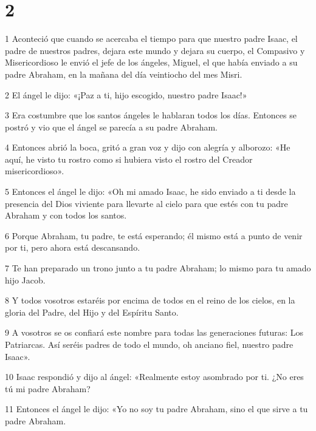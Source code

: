 \chapter{2}

\par 1 Aconteció que cuando se acercaba el tiempo para que nuestro padre Isaac, el padre de nuestros padres, dejara este mundo y dejara su cuerpo, el Compasivo y Misericordioso le envió el jefe de los ángeles, Miguel, el que había enviado a su padre Abraham, en la mañana del día veintiocho del mes Misri.

\par 2 El ángel le dijo: «¡Paz a ti, hijo escogido, nuestro padre Isaac!»

\par 3 Era costumbre que los santos ángeles le hablaran todos los días. Entonces se postró y vio que el ángel se parecía a su padre Abraham.

\par 4 Entonces abrió la boca, gritó a gran voz y dijo con alegría y alborozo: «He aquí, he visto tu rostro como si hubiera visto el rostro del Creador misericordioso».

\par 5 Entonces el ángel le dijo: «Oh mi amado Isaac, he sido enviado a ti desde la presencia del Dios viviente para llevarte al cielo para que estés con tu padre Abraham y con todos los santos.

\par 6 Porque Abraham, tu padre, te está esperando; él mismo está a punto de venir por ti, pero ahora está descansando.

\par 7 Te han preparado un trono junto a tu padre Abraham; lo mismo para tu amado hijo Jacob.

\par 8 Y todos vosotros estaréis por encima de todos en el reino de los cielos, en la gloria del Padre, del Hijo y del Espíritu Santo.

\par 9 A vosotros se os confiará este nombre para todas las generaciones futuras: Los Patriarcas. Así seréis padres de todo el mundo, oh anciano fiel, nuestro padre Isaac».

\par 10 Isaac respondió y dijo al ángel: «Realmente estoy asombrado por ti. ¿No eres tú mi padre Abraham?

\par 11 Entonces el ángel le dijo: «Yo no soy tu padre Abraham, sino el que sirve a tu padre Abraham.

